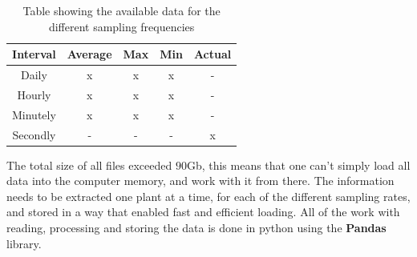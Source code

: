     \begin{table}[]
        \centering
        \begin{tabular}{|c|c|c|c|c|}
            \hline
             Interval   & Average   & Max   & Min   & Actual    \\ \hline
             Daily      & x         & x     & x     & -         \\ \hline
             Hourly     & x         & x     & x     & -         \\ \hline
             Minutely   & x         & x     & x     & -         \\ \hline
             Secondly   & -         & -     & -     & x         \\ \hline
        \end{tabular}
        \caption{Table showing the available data for the different sampling frequencies}
        \label{tab:data_files}
    \end{table}
    
    The total size of all files exceeded $90$Gb, this means that one can't simply load all data into the computer memory, and work with it from there. The information needs to be extracted one plant at a time, for each of the different sampling rates, and stored in a way that enabled fast and efficient loading. All of the work with reading, processing and storing the data is done in python using the \textbf{Pandas} library. 
    
    
    
